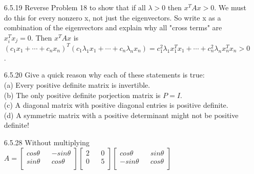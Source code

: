 \documentclass[10pt,twoside,reqno]{article}
\begin{document}
\begin{enumerate}
\vspace{3mm}
\item[6.5.19] Reverse Problem 18 to show that if all $\lambda > 0$ then $x^TAx > 0$. We must do this for every nonzero x, not just the eigenvectors. So write x as a combination of the eigenvectors and explain why all "cross terms" are $x_i^Tx_j = 0$. Then $x^TAx$ is\\
\vspace{3mm}
$(c_1x_1 + \cdots + c_nx_n)^T(c_1\lambda_1x_1 + \cdots + c_n\lambda_nx_n) = c_1^2\lambda_1x_1^Tx_1 + \cdots + c_n^2\lambda_nx_n^Tx_n > 0$.


\vspace{3mm}
\item[6.5.20] Give a quick reason why each of these statements is true:\\
(a) Every positive definite matrix is invertible.\\


\vspace{3mm}
(b) The only positive definite porjection matrix is $P = I$.\\


\vspace{3mm}
(c) A diagonal matrix with positive diagonal entries is positive definite.\\


\vspace{3mm}
(d) A symmetric matrix with a positive determinant might not be positive definite!\\


\vspace{3mm}
\item[6.5.28] Without multiplying
$
$$
A =
\begin{bmatrix}
cos\theta && -sin\theta\\
sin\theta && cos\theta \\
\end{bmatrix}
\begin{bmatrix}
2 && 0\\
0 && 5\\
\end{bmatrix}
\begin{bmatrix}
cos\theta && sin\theta\\
-sin\theta && cos\theta \\
\end{bmatrix}
$$
$



\end{enumerate}
\end{document}
